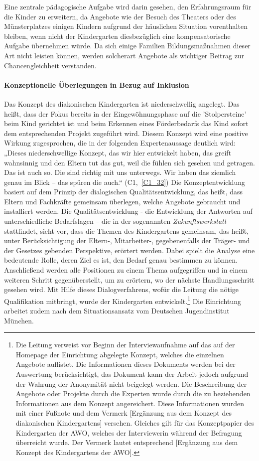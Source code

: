 Eine zentrale pädagogische Aufgabe wird darin gesehen, den Erfahrungsraum für die Kinder zu erweitern, da Angebote wie der Besuch des Theaters oder des Münsterplatzes einigen Kindern aufgrund der häuslichen Situation vorenthalten bleiben, wenn nicht der Kindergarten diesbezüglich eine kompensatorische Aufgabe übernehmen würde. 
Da sich einige Familien Bildungsmaßnahmen dieser Art nicht leisten können, werden solcherart Angebote als wichtiger Beitrag zur Chancengleichheit verstanden.

\paragraph{Konzeptionelle Überlegungen in Bezug auf Inklusion}
Das Konzept des diakonischen Kindergarten ist niederschwellig angelegt. Das heißt, dass der Fokus bereits in der Eingewöhnungsphase auf die 'Stolpersteine' beim Kind gerichtet ist und beim Erkennen eines  Förderbedarfs das Kind sofort dem entsprechenden Projekt zugeführt wird. Diesem Konzept wird eine positive Wirkung zugesprochen, die in der folgenden Expertenaussage deutlich wird: „Dieses niederschwellige Konzept, das wir hier entwickelt haben, das greift wahnsinnig und den Eltern tut das gut, weil die fühlen sich gesehen und getragen. Das ist auch so. Die sind richtig mit uns unterwegs. Wir haben das ziemlich genau im Blick -- das spüren die auch.“ (C1,~\ref{C1_32}) 
Die Konzeptentwicklung basiert auf dem Prinzip der dialogischen Qualitätsentwicklung, das heißt, dass Eltern und Fachkräfte gemeinsam überlegen, welche Angebote gebraucht und installiert werden. Die Qualitätsentwicklung - die Entwicklung der Antworten auf unterschiedliche Bedarfslagen -- die in der sogenannten \emph{Zukunftswerkstatt} stattfindet, sieht vor, dass die Themen des Kindergartens gemeinsam, das heißt, unter Berücksichtigung der Eltern-,  Mitarbeiter-, gegebenenfalls der Träger- und der Gesetzes gebenden Perspektive, erörtert werden. Dabei spielt die Analyse eine bedeutende Rolle, deren Ziel es ist, den Bedarf genau bestimmen zu können.  Anschließend werden alle Positionen zu einem Thema aufgegriffen und in einem weiteren Schritt gegenüberstellt, um zu erörtern, wo der nächste Handlungsschritt gesehen wird. Mit Hilfe dieses Dialogverfahrens, wofür die Leitung die nötige Qualifikation mitbringt, wurde der Kindergarten entwickelt.\footnote{Die Leitung verweist vor Beginn der Interviewaufnahme auf das auf der Homepage der Einrichtung abgelegte Konzept, welches die einzelnen Angebote auflistet. Die Informationen dieses Dokuments werden bei der Auswertung berücksichtigt, das Dokument kann der Arbeit jedoch aufgrund der Wahrung der Anonymität nicht beigelegt werden. Die Beschreibung der Angebote oder Projekte durch die Experten wurde durch die zu beziehenden Informationen aus dem Konzept angereichert. Diese Informationen wurden mit einer Fußnote und dem Vermerk [Ergänzung aus dem Konzept des diakonischen Kindergartens] versehen. Gleiches gilt für das Konzeptpapier des Kindergarten der AWO, welches der Interviewerin während der Befragung überreicht wurde. Der Vermerk lautet entsprechend [Ergänzung aus dem Konzept des Kindergartens der AWO].} Die Einrichtung arbeitet zudem nach dem Situationsansatz vom Deutschen Jugendinstitut München. 

